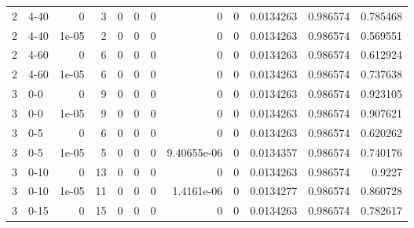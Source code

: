 \begin{tabular}{rlrrrrrrrrrr}
     2 & 4-40   &      0     &           3 &                 0 &                 0 &     0           &     0           &      0           &        0.0134263 &               0.986574 &           0.785468 \\
     2 & 4-40   &      1e-05 &           2 &                 0 &                 0 &     0           &     0           &      0           &        0.0134263 &               0.986574 &           0.569551 \\
     2 & 4-60   &      0     &           6 &                 0 &                 0 &     0           &     0           &      0           &        0.0134263 &               0.986574 &           0.612924 \\
     2 & 4-60   &      1e-05 &           6 &                 0 &                 0 &     0           &     0           &      0           &        0.0134263 &               0.986574 &           0.737638 \\
     3 & 0-0    &      0     &           9 &                 0 &                 0 &     0           &     0           &      0           &        0.0134263 &               0.986574 &           0.923105 \\
     3 & 0-0    &      1e-05 &           9 &                 0 &                 0 &     0           &     0           &      0           &        0.0134263 &               0.986574 &           0.907621 \\
     3 & 0-5    &      0     &           6 &                 0 &                 0 &     0           &     0           &      0           &        0.0134263 &               0.986574 &           0.620262 \\
     3 & 0-5    &      1e-05 &           5 &                 0 &                 0 &     0           &     9.40655e-06 &      0           &        0.0134357 &               0.986574 &           0.740176 \\
     3 & 0-10   &      0     &          13 &                 0 &                 0 &     0           &     0           &      0           &        0.0134263 &               0.986574 &           0.9227   \\
     3 & 0-10   &      1e-05 &          11 &                 0 &                 0 &     0           &     1.4161e-06  &      0           &        0.0134277 &               0.986574 &           0.860728 \\
     3 & 0-15   &      0     &          15 &                 0 &                 0 &     0           &     0           &      0           &        0.0134263 &               0.986574 &           0.782617 \\

\end{tabular}
